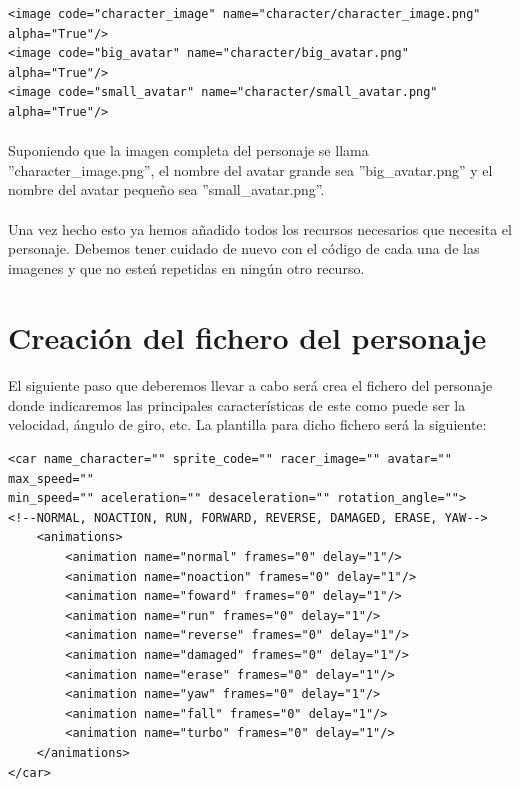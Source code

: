 \begin{lstlisting}[style=XML]
<image code="character_image" name="character/character_image.png" alpha="True"/>
<image code="big_avatar" name="character/big_avatar.png" alpha="True"/>
<image code="small_avatar" name="character/small_avatar.png" alpha="True"/>
\end{lstlisting}

\paragraph{}
Suponiendo que la imagen completa del personaje se llama ''character\_image.png'', el nombre del avatar grande sea 
''big\_avatar.png'' y el nombre del avatar pequeño sea ''small\_avatar.png''.

\paragraph{}
Una vez hecho esto ya hemos añadido todos los recursos necesarios que necesita el personaje. Debemos tener cuidado de nuevo con el
código de cada una de las imagenes y que no esteń repetidas en ningún otro recurso.

\section{Creación del fichero del personaje}

\paragraph{}
El siguiente paso que deberemos llevar a cabo será crea el fichero del personaje donde indicaremos las principales características
de este como puede ser la velocidad, ángulo de giro, etc. La plantilla para dicho fichero será la siguiente:

\begin{lstlisting}[style=XML]
<car name_character="" sprite_code="" racer_image="" avatar="" max_speed="" 
min_speed="" aceleration="" desaceleration="" rotation_angle="">
<!--NORMAL, NOACTION, RUN, FORWARD, REVERSE, DAMAGED, ERASE, YAW-->
    <animations>
        <animation name="normal" frames="0" delay="1"/>
        <animation name="noaction" frames="0" delay="1"/>
        <animation name="foward" frames="0" delay="1"/>
        <animation name="run" frames="0" delay="1"/>
        <animation name="reverse" frames="0" delay="1"/>
        <animation name="damaged" frames="0" delay="1"/>
        <animation name="erase" frames="0" delay="1"/>
        <animation name="yaw" frames="0" delay="1"/>
        <animation name="fall" frames="0" delay="1"/>
        <animation name="turbo" frames="0" delay="1"/>
    </animations>
</car>
\end{lstlisting}


